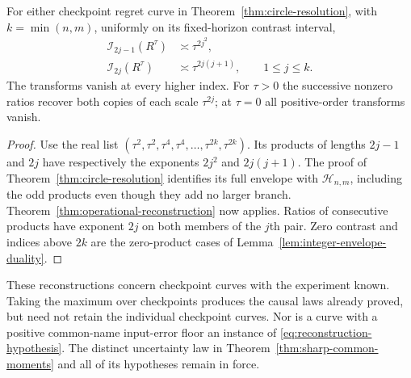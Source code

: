 \begin{corollary}
\label{cor:circular-operational-recovery}
For either checkpoint regret curve in
Theorem~\ref{thm:circle-resolution}, with $k=\min(n,m)$, uniformly on
its fixed-horizon contrast interval,
\begin{equation}\label{eq:circle-operational-recovery}
 \begin{split}
 \mathcal I_{2j-1}(R^\tau)&\asymp\tau^{2j^2},\\
 \mathcal I_{2j}(R^\tau)&\asymp\tau^{2j(j+1)},
             \qquad 1\le j\le k.
 \end{split}
\end{equation}
The transforms vanish at every higher index. For $\tau>0$ the
successive nonzero ratios recover both copies of each scale
$\tau^{2j}$; at $\tau=0$ all positive-order transforms vanish.
\end{corollary}
\begin{proof}
Use the real list
$(\tau^2,\tau^2,\tau^4,\tau^4,\ldots,\tau^{2k},\tau^{2k})$.
Its products of lengths $2j-1$ and $2j$ have respectively the exponents
$2j^2$ and $2j(j+1)$. The proof of
Theorem~\ref{thm:circle-resolution} identifies its full envelope with
$\mathcal H_{n,m}$, including the odd products even though they add no
larger branch. Theorem~\ref{thm:operational-reconstruction} now applies.
Ratios of consecutive products have exponent $2j$ on both members of
the $j$th pair. Zero contrast and indices above $2k$ are the zero-product
cases of Lemma~\ref{lem:integer-envelope-duality}.
\end{proof}

These reconstructions concern checkpoint curves with the experiment
known. Taking the maximum over checkpoints produces the causal laws
already proved, but need not retain the individual checkpoint curves.
Nor is a curve with a positive common-name input-error floor an instance
of \eqref{eq:reconstruction-hypothesis}. The distinct uncertainty law in
Theorem~\ref{thm:sharp-common-moments} and all of its hypotheses remain
in force.
